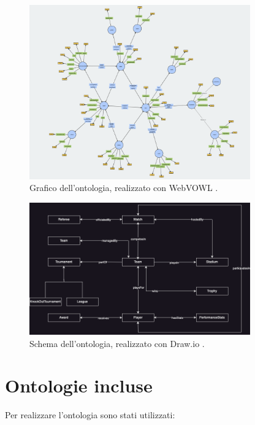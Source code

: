 \documentclass[11pt]{report} %
\begin{document}
\begin{figure}[H]
    \begin{center}
        \includegraphics[width=0.85\textwidth]{footology_2.1.png}
    \end{center}
    \caption{Grafico dell'ontologia, realizzato con WebVOWL \cite{webvowl,foot}.}
\end{figure}
\begin{figure}[H]
    \begin{center}
        \includegraphics[width=0.85\textwidth]{footology_v2.1_schema.png}
    \end{center}
    \caption{Schema dell'ontologia, realizzato con Draw.io \cite{drawio, foot}.}
\end{figure}
    
\section{Ontologie incluse}

Per realizzare l'ontologia sono stati utilizzati:
\end{document}
